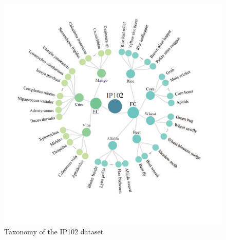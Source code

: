 \begin{figure}
    \centering
    \includegraphics[scale=1.4]{figures/ip102map.png}
    \caption{ Taxonomy of the IP102 dataset \cite{wu2019ip102}}
    \label{fig:my_label}
\end{figure}


\begin{center}
    
\end{center}

\vspace{300px}

\newpage

